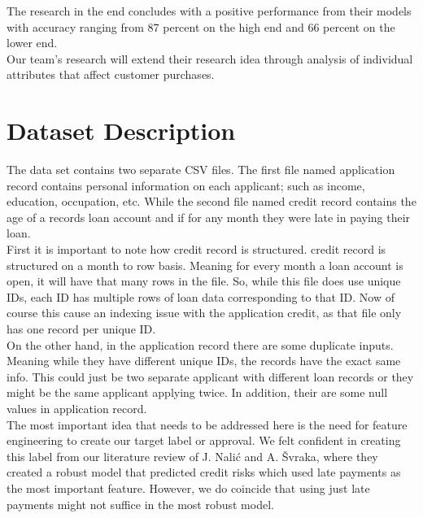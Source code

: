\documentclass[12pt]{article}
\begin{document}
\noindent The research in the end concludes with a positive performance from their models with accuracy ranging from 87 percent on the high end and 66 percent on the lower end.\\

\noindent Our team's research will extend their research idea through analysis of individual attributes that affect customer purchases.\\

\section{Dataset Description}


\noindent The data set contains two separate CSV files. The first file named application record contains personal information on each applicant; such as income, education, occupation, etc. While the second file named credit record contains the age of a records loan account and if for any month they were late in paying their loan.\\

\noindent First it is important to note how credit record is structured. credit record is structured on a month to row basis. Meaning for every month a loan account is open, it will have that many rows in the file. So, while this file does use unique  IDs, each ID has multiple rows of loan data corresponding to that ID. Now of course this cause an indexing issue with the application credit, as that file only has one record per unique ID.\\

\noindent On the other hand, in the application record there are some duplicate inputs. Meaning while they have different unique IDs, the records have the exact same info. This could just be two separate applicant with different loan records or they might be the same applicant applying twice. In addition, their are some null values in application record.\\

\noindent The most important idea that needs to be addressed here is the need for feature engineering to create our target label or approval. We felt confident in creating this label from our literature review of  J. Nalić and A. Švraka, where they created a robust model that predicted credit risks which used late payments as the most important feature. However, we do coincide that using just late payments might not suffice in the most robust model.\\
\end{document}
